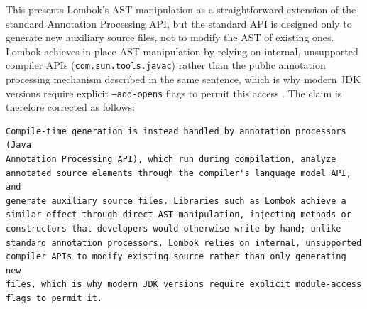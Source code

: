 \documentclass[11pt]{report}
\begin{document}
This presents Lombok's AST manipulation as a straightforward extension of
the standard Annotation Processing API, but the standard API is designed
only to generate new auxiliary source files, not to modify the AST of
existing ones. Lombok achieves in-place AST manipulation by relying on
internal, unsupported compiler APIs (\texttt{com.sun.tools.javac}) rather
than the public annotation processing mechanism described in the same
sentence, which is why modern JDK versions require explicit
\texttt{--add-opens} flags to permit this access \cite{lombok_project}.
The claim is therefore corrected as follows:

\begin{Verbatim}[breaklines=true]
Compile-time generation is instead handled by annotation processors (Java
Annotation Processing API), which run during compilation, analyze
annotated source elements through the compiler's language model API, and
generate auxiliary source files. Libraries such as Lombok achieve a
similar effect through direct AST manipulation, injecting methods or
constructors that developers would otherwise write by hand; unlike
standard annotation processors, Lombok relies on internal, unsupported
compiler APIs to modify existing source rather than only generating new
files, which is why modern JDK versions require explicit module-access
flags to permit it.
\end{Verbatim}

% 



\end{document}
